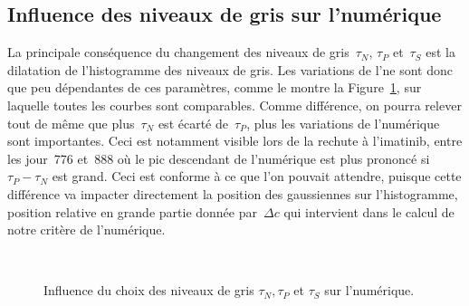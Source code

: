 \documentclass[main.tex]{subfiles}
\begin{document}
\subsection{Influence des niveaux de gris sur l'\hetero numérique}
La principale conséquence du changement des niveaux de gris~$\tau_N$, $\tau_P$ et~$\tau_S$ est la dilatation de l'histogramme des niveaux de gris. 
Les variations de l'\hetero ne sont donc que peu dépendantes de ces paramètres, comme le montre 
la Figure~\ref{fig:impact_grey_lvl_on_hetero}, sur laquelle toutes les courbes sont comparables. Comme différence, on pourra relever tout de même que plus~$\tau_N$ est écarté de~$\tau_P$, plus les variations de l'\hetero numérique sont importantes. Ceci est notamment visible lors de la rechute à l'imatinib, entre les jour~776 et~888 où le pic descendant de l'\hetero numérique est plus prononcé si~$\tau_P-\tau_N$ est grand. Ceci est conforme à ce que l'on pouvait attendre, puisque cette différence va impacter directement la position des gaussiennes sur l'histogramme, position relative en grande partie donnée par~$\Delta c$ qui intervient dans le calcul de notre critère de l'\hetero numérique.

\begin{figure}[h]
\centering
{}
\\
\caption{\label{fig:impact_grey_lvl_on_hetero} Influence du choix des niveaux de gris $\tau_N, \tau_P$ et $\tau_S$ sur l'\hetero numérique.}
\end{figure}

\subsection{\Chen}
\end{document}
